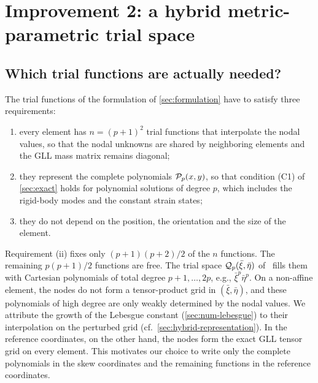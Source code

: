 \section{Improvement 2: a hybrid metric-parametric trial space}
\label{sec:hybrid}
%
\subsection{Which trial functions are actually needed?}
\label{sec:hybrid-requirements}
%
The trial functions of the formulation of \cref{sec:formulation} have to satisfy three requirements:
\begin{enumerate}
  \item[(i)] every element has $n=(p+1)^2$ trial functions that interpolate the nodal values, so that the nodal unknowns are shared by neighboring elements and the GLL mass matrix remains diagonal;
  \item[(ii)] they represent the complete polynomials $\mathcal P_p(x,y)$, so that condition (C1) of \cref{sec:exact} holds for polynomial solutions of degree $p$, which includes the rigid-body modes and the constant strain states;
  \item[(iii)] they do not depend on the position, the orientation and the size of the element.
\end{enumerate}
Requirement (ii) fixes only $(p+1)(p+2)/2$ of the $n$ functions. The remaining $p(p+1)/2$ functions are free. The trial space $\mathcal Q_p(\bar\xi,\bar\eta)$ of \PM\ fills them with Cartesian polynomials of total degree $p+1,\dots,2p$, e.g., $\bar\xi^p\bar\eta^p$. On a non-affine element, the nodes do not form a tensor-product grid in $(\bar\xi,\bar\eta)$, and these polynomials of high degree are only weakly determined by the nodal values. We attribute the growth of the Lebesgue constant (\cref{sec:num-lebesgue}) to their interpolation on the perturbed grid (cf.\ \cref{sec:hybrid-representation}). In the reference coordinates, on the other hand, the nodes form the exact GLL tensor grid on every element. This motivates our choice to write only the complete polynomials in the skew coordinates and the remaining functions in the reference coordinates.
%
